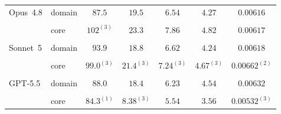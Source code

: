 \begin{table}[H]
\begin{tabular}{ll*{5}{c}}
Opus~4.8 & domain & \cellcolor{llpC}$87.5$ & \cellcolor{llpB}$19.5$ & \cellcolor{llpB}$6.54$ & \cellcolor{llpB}$4.27$ & \cellcolor{llpA}$0.00616$ \\
& & \cellcolor{llpC}{\scriptsize$[83.0,\,88.9]$} & \cellcolor{llpB}{\scriptsize$[17.6,\,21.4]$} & \cellcolor{llpB}{\scriptsize$[6.29,\,7.44]$} & \cellcolor{llpB}{\scriptsize$[4.16,\,5.29]$} & \cellcolor{llpA}{\scriptsize$[0.00612,\,0.00633]$} \\[2pt]
 & core & \cellcolor{llpB}$102^{(3)}$ & \cellcolor{llpB}$23.3$ & \cellcolor{llpB}$7.86$ & \cellcolor{llpA}$4.82$ & \cellcolor{llpA}$0.00617$ \\
& & \cellcolor{llpB}{\scriptsize$[96.2,\,122]$} & \cellcolor{llpB}{\scriptsize$[21.2,\,28.0]$} & \cellcolor{llpB}{\scriptsize$[7.33,\,10.0]$} & \cellcolor{llpA}{\scriptsize$[4.58,\,6.28]$} & \cellcolor{llpA}{\color{llpSpread}{\scriptsize$[0.00587,\,0.0177]$}} \\[2pt]
Sonnet~5 & domain & \cellcolor{llpC}$93.9$ & \cellcolor{llpC}$18.8$ & \cellcolor{llpB}$6.62$ & \cellcolor{llpB}$4.24$ & \cellcolor{llpA}$0.00618$ \\
& & \cellcolor{llpC}{\scriptsize$[88.1,\,125]$} & \cellcolor{llpC}{\scriptsize$[17.8,\,24.2]$} & \cellcolor{llpB}{\scriptsize$[6.21,\,7.50]$} & \cellcolor{llpB}{\scriptsize$[3.97,\,5.46]$} & \cellcolor{llpA}{\scriptsize$[0.00613,\,0.00658]$} \\[2pt]
 & core & \cellcolor{llpB}$99.0^{(3)}$ & \cellcolor{llpA}$21.4^{(3)}$ & \cellcolor{llpA}$7.24^{(3)}$ & \cellcolor{llpA}$4.67^{(3)}$ & \cellcolor{llpB}$0.00662^{(2)}$ \\
& & \cellcolor{llpB}{\scriptsize$[76.6,\,104]$} & \cellcolor{llpA}{\scriptsize$[19.1,\,21.8]$} & \cellcolor{llpA}{\scriptsize$[5.82,\,7.93]$} & \cellcolor{llpA}{\scriptsize$[4.01,\,4.95]$} & \cellcolor{llpB}{\scriptsize$[0.00571,\,0.00754]$} \\[2pt]
GPT-5.5 & domain & \cellcolor{llpC}$88.0$ & \cellcolor{llpC}$18.4$ & \cellcolor{llpC}$6.23$ & \cellcolor{llpA}$4.54$ & \cellcolor{llpA}$0.00632$ \\
& & \cellcolor{llpC}{\scriptsize$[85.6,\,88.9]$} & \cellcolor{llpC}{\scriptsize$[18.1,\,24.7]$} & \cellcolor{llpC}{\scriptsize$[5.95,\,6.94]$} & \cellcolor{llpA}{\scriptsize$[4.23,\,4.61]$} & \cellcolor{llpA}{\scriptsize$[0.00615,\,0.00664]$} \\[2pt]
 & core & \cellcolor{llpC}$84.3^{(1)}$ & \cellcolor{llpD}$8.38^{(3)}$ & \cellcolor{llpC}$5.54$ & \cellcolor{llpC}$3.56$ & \cellcolor{llpC}$0.00532^{(3)}$ \\

\end{tabular}
\end{table}

